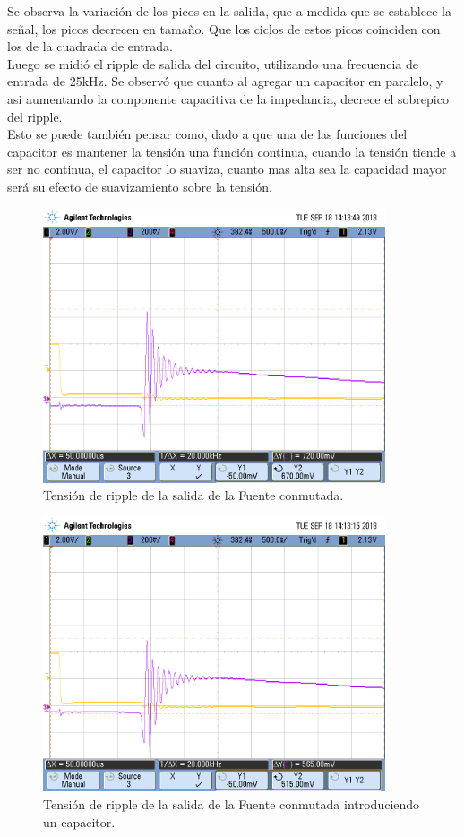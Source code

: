 Se observa la variación de los picos en la salida, que a medida que se establece la señal, los picos decrecen en tamaño. Que los ciclos de estos picos coinciden con los de la cuadrada de entrada.\\
Luego se midió el ripple de salida del circuito, utilizando una frecuencia de entrada de 25kHz. Se observó que cuanto al agregar un capacitor en paralelo, y asi aumentando la componente capacitiva de la impedancia, decrece el sobrepico del ripple.\\Esto se puede también pensar como, dado a que una de las funciones del capacitor es mantener la tensión una función continua, cuando la tensión tiende a ser no continua, el capacitor lo suaviza, cuanto mas alta sea la capacidad mayor será su efecto de suavizamiento sobre la tensión.
\begin{figure}[H]
	\centering
	\includegraphics[width=0.9\textwidth]{Imagenes/ripple_.png}
\caption{Tensión de ripple de la salida de la Fuente conmutada.}
	\label{fig:fconr}
\end{figure}
\begin{figure}[H]
	\centering
	\includegraphics[width=0.9\textwidth]{Imagenes/ripple_c.png}
\caption{Tensión de ripple de la salida de la Fuente conmutada introduciendo un capacitor.}
	\label{fig:fconrc}
\end{figure}

